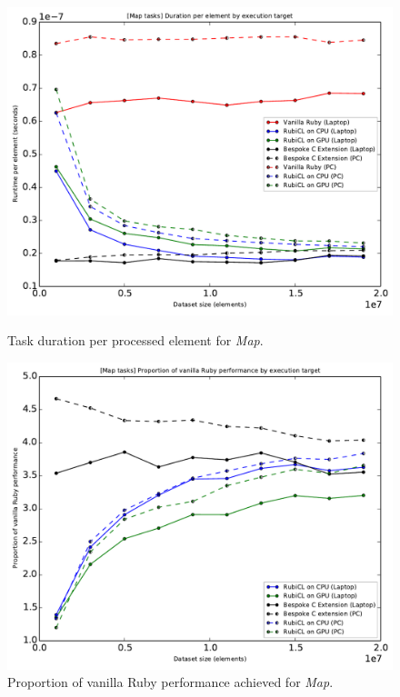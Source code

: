\begin{figure}[H]
  \centering

  \includegraphics[width=\textwidth]{./graphing/just_map/per_element.pdf}
  \caption{Task duration per processed element for \emph{Map}.}
  \label{fig:map_task_per_el_g}

  \includegraphics[width=\textwidth]{./graphing/just_map/prop_van.pdf}
  \caption{Proportion of vanilla Ruby performance achieved for \emph{Map}.}
  \label{fig:map_task_vperf_g}
\end{figure}
